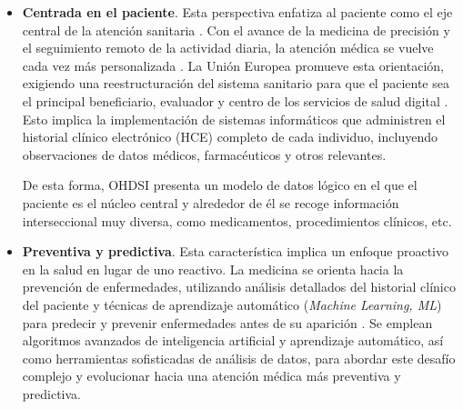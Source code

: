 \begin{itemize}


\item \textbf{Centrada en el paciente}. Esta perspectiva enfatiza al paciente como el eje central de la atención sanitaria \cite{tortorella2020healthcare}. Con el avance de la medicina de precisión y el seguimiento remoto de la actividad diaria, la atención médica se vuelve cada vez más personalizada \cite{ruiz2023inteligencia}. La Unión Europea promueve esta orientación, exigiendo una reestructuración del sistema sanitario para que el paciente sea el principal beneficiario, evaluador y centro de los servicios de salud digital \cite{ntafi2022legal, katehakis2019framework}. Esto implica la implementación de sistemas informáticos que administren el historial clínico electrónico (HCE) completo de cada individuo, incluyendo observaciones de datos médicos, farmacéuticos y otros relevantes.

De esta forma, OHDSI presenta un modelo de datos lógico en el que el paciente es el núcleo central y alrededor de él se recoge información interseccional muy diversa, como medicamentos, procedimientos clínicos, etc.




\item \textbf{Preventiva y predictiva}. Esta característica implica un enfoque proactivo en la salud en lugar de uno reactivo. La medicina se orienta hacia la prevención de enfermedades, utilizando análisis detallados del historial clínico del paciente y técnicas de aprendizaje automático (\textit{Machine Learning, ML}) para predecir y prevenir enfermedades antes de su aparición \cite{ruiz2023inteligencia}. Se emplean algoritmos avanzados de inteligencia artificial y aprendizaje automático, así como herramientas sofisticadas de análisis de datos, para abordar este desafío complejo y evolucionar hacia una atención médica más preventiva y predictiva.


\end{itemize}
